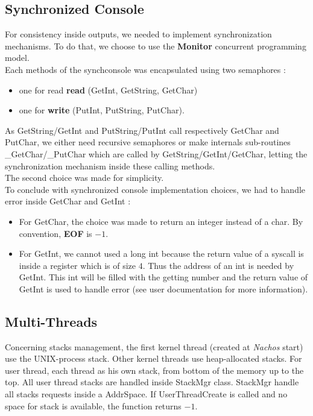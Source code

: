 \subsection{Synchronized Console}

For consistency inside outputs, we needed to implement synchronization
mechanisms. To do that, we choose to use the \textbf{Monitor} concurrent
programming model.\\
Each methods of the synchconsole was encapsulated using two
semaphores :
\begin{itemize}
    \item one for read \textbf{read} (GetInt, GetString, GetChar)
    \item one for \textbf{write} (PutInt, PutString, PutChar).
\end{itemize}

As GetString/GetInt and PutString/PutInt call respectively GetChar and PutChar,
we either need recursive semaphores or make internals sub-routines
\_GetChar/\_PutChar which are called by GetString/GetInt/GetChar, letting the
synchronization mechanism inside these calling methods.\\
The second choice was made for simplicity.\\

To conclude with synchronized console implementation choices, we had to handle
error inside GetChar and GetInt :
\begin{itemize}
    \item For GetChar, the choice was made to return an integer instead of a char. By
convention, \textbf{EOF} is $-1$.
    \item For GetInt, we cannot used a long int because the return value of a syscall is
inside a register which is of size $4$. Thus the address of an int is needed by
GetInt. This int will be filled with the getting number and the return value of
GetInt is used to handle error (see user documentation for more information).
\end{itemize}

\subsection{Multi-Threads}

Concerning stacks management, the first kernel thread (created at \emph{Nachos}
start) use the UNIX-process stack. Other kernel threads use heap-allocated
stacks. For user thread, each thread as his own stack, from bottom of the memory
up to the top. All user thread stacks are handled inside StackMgr class.
StackMgr handle all stacks requests inside a AddrSpace. If UserThreadCreate is
called and no space for stack is available, the function returns $-1$.\\

